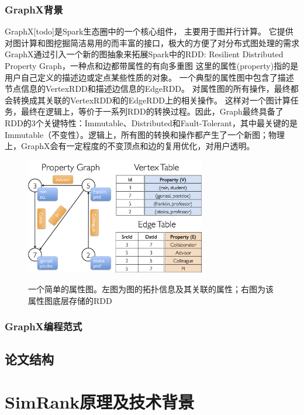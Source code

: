 \documentclass[master]{njuthesis}
\begin{document}
\subsection{GraphX背景}
GraphX[todo]是Spark生态圈中的一个核心组件， 主要用于图并行计算。
它提供对图计算和图挖掘简洁易用的而丰富的接口，极大的方便了对分布式图处理的需求
GraphX通过引入一个新的图抽象来拓展Spark中的RDD: Resilient Distributed Property Graph，一种点和边都带属性的有向多重图
这里的属性(property)指的是用户自己定义的描述边或定点某些性质的对象。
一个典型的属性图中包含了描述节点信息的VertexRDD和描述边信息的EdgeRDD。
对属性图的所有操作，最终都会转换成其关联的VertexRDD和的EdgeRDD上的相关操作。
这样对一个图计算任务，最终在逻辑上，等价于一系列RDD的转换过程。因此，Graph最终具备了RDD的3个关键特性：Immutable、Distributed和Fault-Tolerant，其中最关键的是Immutable（不变性）。逻辑上，所有图的转换和操作都产生了一个新图；物理上，GraphX会有一定程度的不变顶点和边的复用优化，对用户透明。
\begin{figure}[htbp]
  \centering
  \includegraphics[width= 0.7\textwidth]{figure/property_graph.png}\\
  \caption{一个简单的属性图。左图为图的拓扑信息及其关联的属性；右图为该属性图底层存储的RDD}\label{fig:property_graph}
\end{figure}
\subsection{GraphX编程范式}
\section{论文结构}


\chapter{SimRank原理及技术背景}\label{chapter_smallworld}
\end{document}
